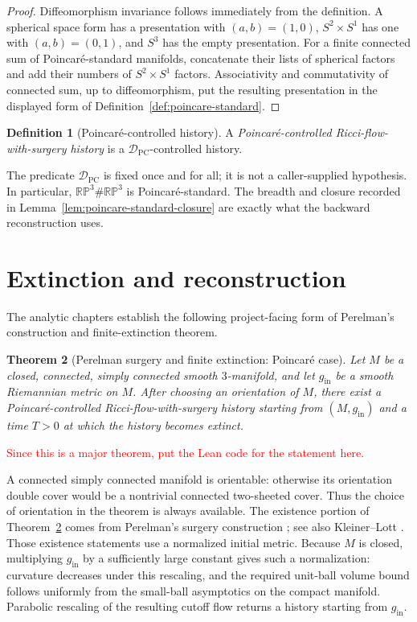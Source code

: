 \documentclass[10pt]{coll-l}
\newtheorem{theorem}{Theorem}[chapter]
\theoremstyle{definition}
\newtheorem{definition}[theorem]{Definition}
\theoremstyle{remark}
\numberwithin{section}{chapter}
\numberwithin{equation}{chapter}
\begin{document}
\begin{proof}
Diffeomorphism invariance follows immediately from the definition.  A
spherical space form has a presentation with $(a,b)=(1,0)$,
$S^{2}\times S^{1}$ has one with $(a,b)=(0,1)$, and $S^{3}$ has the empty
presentation.  For a finite connected sum of Poincar\'e-standard manifolds,
concatenate their lists of spherical factors and add their numbers of
$S^{2}\times S^{1}$ factors.  Associativity and commutativity of connected
sum, up to diffeomorphism, put the resulting presentation in the displayed
form of Definition~\ref{def:poincare-standard}.
\end{proof}

\begin{definition}[Poincar\'e-controlled history]
\label{def:poincare-control}
A \emph{Poincar\'e-controlled Ricci-flow-with-surgery history} is a
$\mathcal D_{\mathrm{PC}}$-controlled history.
\end{definition}

The predicate $\mathcal D_{\mathrm{PC}}$ is fixed once and for all; it is not
a caller-supplied hypothesis.  In particular,
$\mathbb{RP}^{3}\#\mathbb{RP}^{3}$ is Poincar\'e-standard.  The breadth and
closure recorded in Lemma~\ref{lem:poincare-standard-closure} are exactly
what the backward reconstruction uses.

\section{Extinction and reconstruction}

The analytic chapters establish the following project-facing form of
Perelman's construction and finite-extinction theorem.

\begin{theorem}[Perelman surgery and finite extinction: Poincar\'e case]
\label{thm:finite-extinction}
Let $M$ be a closed, connected, simply connected smooth $3$-manifold, and let
$g_{\mathrm{in}}$ be a smooth Riemannian metric on $M$.  After choosing an
orientation of $M$, there exist a Poincar\'e-controlled
Ricci-flow-with-surgery history starting from $(M,g_{\mathrm{in}})$ and a
time $T>0$ at which the history becomes extinct.
\end{theorem}

\textcolor{red}{Since this is a major theorem, put the Lean code for the statement here.}

A connected simply connected manifold is orientable: otherwise its
orientation double cover would be a nontrivial connected two-sheeted cover.
Thus the choice of orientation in the theorem is always available.  The
existence portion of Theorem~\ref{thm:finite-extinction} comes from
Perelman's surgery construction \cite[\S6.1]{Perelman2}; see also
Kleiner--Lott \cite[Proposition~77.2]{MR2460872}.  Those existence statements
use a normalized initial metric.  Because $M$ is closed, multiplying
$g_{\mathrm{in}}$ by a sufficiently large constant gives such a
normalization: curvature decreases under this rescaling, and the required
unit-ball volume bound follows uniformly from the small-ball asymptotics on
the compact manifold.  Parabolic rescaling of the resulting cutoff flow
returns a history starting from $g_{\mathrm{in}}$.
\end{document}
